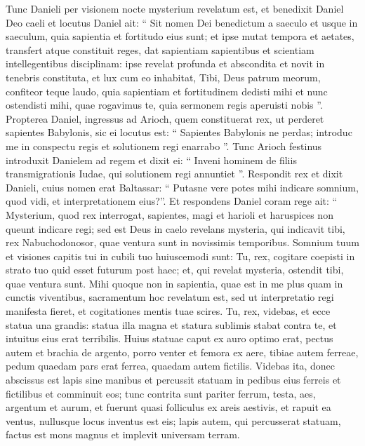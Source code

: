 \begin{biblechapter}
\begin{biblechapter}
\verse Tunc Danieli per visionem nocte mysterium revelatum est, et benedixit Daniel Deo caeli 
\verse et locutus Daniel ait:
 “ Sit nomen Dei benedictum
 a saeculo et usque in saeculum,
 quia sapientia et fortitudo eius sunt;
 \verse et ipse mutat tempora et aetates,
 transfert atque constituit reges,
 dat sapientiam sapientibus
 et scientiam intellegentibus disciplinam:
 \verse ipse revelat profunda et abscondita
 et novit in tenebris constituta,
 et lux cum eo inhabitat,
 \verse Tibi, Deus patrum meorum, confiteor teque laudo,
 quia sapientiam et fortitudinem dedisti mihi
 et nunc ostendisti mihi, quae rogavimus te,
 quia sermonem regis aperuisti nobis ”.
 \verse Propterea Daniel, ingressus ad Arioch, quem constituerat rex, ut perderet sapientes Babylonis, sic ei locutus est: “ Sapientes Babylonis ne perdas; introduc me in conspectu regis et solutionem regi enarrabo ”. 
\verse Tunc Arioch festinus introduxit Danielem ad regem et dixit ei: “ Inveni hominem de filiis transmigrationis Iudae, qui solutionem regi annuntiet ”. 
\verse Respondit rex et dixit Danieli, cuius nomen erat Baltassar: “ Putasne vere potes mihi indicare somnium, quod vidi, et interpretationem eius?”. 
\verse Et respondens Daniel coram rege ait: “ Mysterium, quod rex interrogat, sapientes, magi et harioli et haruspices non queunt indicare regi; 
\verse sed est Deus in caelo revelans mysteria, qui indicavit tibi, rex Nabuchodonosor, quae ventura sunt in novissimis temporibus. Somnium tuum et visiones capitis tui in cubili tuo huiuscemodi sunt:
 \verse Tu, rex, cogitare coepisti in strato tuo quid esset futurum post haec; et, qui revelat mysteria, ostendit tibi, quae ventura sunt. 
\verse Mihi quoque non in sapientia, quae est in me plus quam in cunctis viventibus, sacramentum hoc revelatum est, sed ut interpretatio regi manifesta fieret, et cogitationes mentis tuae scires.
 \verse Tu, rex, videbas, et ecce statua una grandis: statua illa magna et statura sublimis stabat contra te, et intuitus eius erat terribilis. 
\verse Huius statuae caput ex auro optimo erat, pectus autem et brachia de argento, porro venter et femora ex aere, 
\verse tibiae autem ferreae, pedum quaedam pars erat ferrea, quaedam autem fictilis. 
\verse Videbas ita, donec abscissus est lapis sine manibus et percussit statuam in pedibus eius ferreis et fictilibus et comminuit eos; 
\verse tunc contrita sunt pariter ferrum, testa, aes, argentum et aurum, et fuerunt quasi folliculus ex areis aestivis, et rapuit ea ventus, nullusque locus inventus est eis; lapis autem, qui percusserat statuam, factus est mons magnus et implevit universam terram.

\end{biblechapter}
\end{biblechapter}
